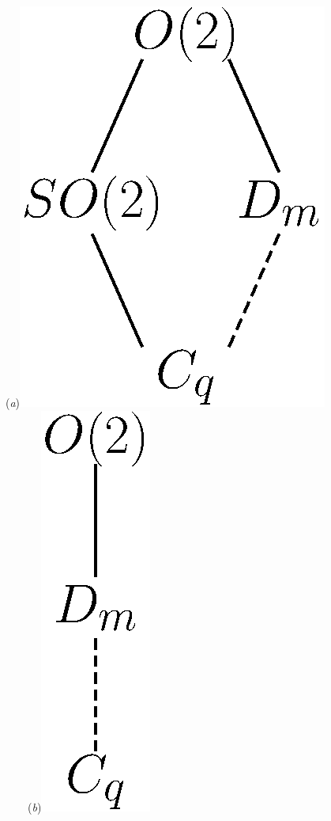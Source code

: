 \begin{example}
\begin{figure}
\begin{center}
  (\textit{a})\includegraphics[height=0.15\textheight]{../figs/O2lattice}
~~~~(\textit{b})\includegraphics[height=0.15\textheight]{../figs/O2stablattice}

\end{center}
\end{figure}
\end{example}
